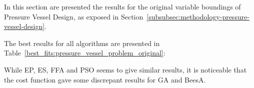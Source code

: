 In this section are presented the results for the original variable boundings of Pressure Vessel Design,
as exposed in Section~\ref{subsubsec:methodology-pressure-vessel-design}.

The best results for all algorithms are presented in Table~\ref{best_fits:pressure_vessel_problem_original}:

\begin{table}[H]
\centering
\caption{Best Fits for Pressure Vessel Design (Original)}
\label{best_fits:pressure_vessel_problem_original}
\end{table}

While EP, ES, FFA and PSO seems to give similar results, it is noticeable that the cost function
gave some discrepant results for GA and BeesA.

